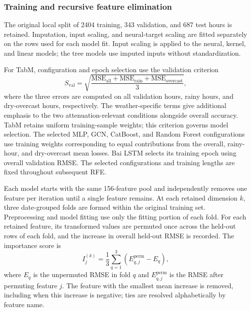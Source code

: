 \subsubsection{Training and recursive feature elimination}

The original local split of 2404 training, 343 validation, and 687 test hours is retained. Imputation, input scaling, and neural-target scaling are fitted separately on the rows used for each model fit. Input scaling is applied to the neural, kernel, and linear models; the tree models use imputed inputs without standardization.

For TabM, configuration and epoch selection use the validation criterion
\begin{equation}
S_{\mathrm{val}}
=
\sqrt{
\frac{
\mathrm{MSE}_{\mathrm{all}}
+
\mathrm{MSE}_{\mathrm{rain}}
+
\mathrm{MSE}_{\mathrm{overcast}}
}{3}
},
\label{eq:weather_validation_score}
\end{equation}
where the three errors are computed on all validation hours, rainy hours, and dry-overcast hours, respectively. The weather-specific terms give additional emphasis to the two attenuation-relevant conditions alongside overall accuracy. TabM retains uniform training-sample weights; this criterion governs model selection. The selected MLP, GCN, CatBoost, and Random Forest configurations use training weights corresponding to equal contributions from the overall, rainy-hour, and dry-overcast mean losses. Bai LSTM selects its training epoch using overall validation RMSE. The selected configurations and training lengths are fixed throughout subsequent RFE.

Each model starts with the same 156-feature pool and independently removes one feature per iteration until a single feature remains. At each retained dimension $k$, three date-grouped folds are formed within the original training set. Preprocessing and model fitting use only the fitting portion of each fold. For each retained feature, its transformed values are permuted once across the held-out rows of each fold, and the increase in overall held-out RMSE is recorded. The importance score is
\begin{equation}
I_j^{(k)}
=
\frac{1}{3}
\sum_{q=1}^{3}
\left(
E_{q,j}^{\mathrm{perm}}-E_q
\right),
\label{eq:permutation_rfe}
\end{equation}
where $E_q$ is the unpermuted RMSE in fold $q$ and $E_{q,j}^{\mathrm{perm}}$ is the RMSE after permuting feature $j$. The feature with the smallest mean increase is removed, including when this increase is negative; ties are resolved alphabetically by feature name.

